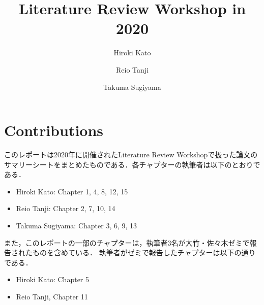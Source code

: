 \documentclass[12pt, a4paper, titlepage]{report}
\title{Literature Review Workshop in 2020}
\author{Hiroki Kato \and Reio Tanji \and Takuma Sugiyama}
\def\biblio{}
\begin{document}
    \def\biblio{}

    \maketitle

    \chapter*{Contributions}

    このレポートは2020年に開催されたLiterature Review Workshopで扱った論文のサマリーシートをまとめたものである．各チャプターの執筆者は以下のとおりである．
    \begin{itemize}
        \item Hiroki Kato: Chapter 1, 4, 8, 12, 15
        \item Reio Tanji: Chapter 2, 7, 10, 14
        \item Takuma Sugiyama: Chapter 3, 6, 9, 13
    \end{itemize}
    また，このレポートの一部のチャプターは，執筆者3名が大竹・佐々木ゼミで報告されたものを含めている．
    執筆者がゼミで報告したチャプターは以下の通りである．
    \begin{itemize}
        \item Hiroki Kato: Chapter 5
        \item Reio Tanji, Chapter 11
    \end{itemize}


    \clearpage

    \tableofcontents
    \clearpage

    
    
    
    
    
    
    
    
    
    
    
    
    
    
    
    
    
    

    
    
\end{document}
